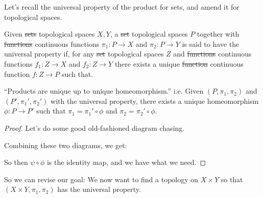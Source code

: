 \documentclass[12pt, twosided]{article}
\begin{document}
  Let's recall the universal property of the product for sets, and amend it for topological spaces.
  \begin{thm}
    Given \sout{sets} {\color{red} topological spaces} \(X, Y\), a \sout{set} {\color{red} topological spaces} \(P\) together with \sout{functions} {\color{red} continuous functions} \(\pi_1: P \to X\) and \(\pi_2: P \to Y\) is said to have the universal property if, for any \sout{set} {\color{red} topological spaces} \(Z\) and \sout{functions} {\color{red} continuous functions} \(f_1: Z \to X\) and \(f_2: Z \to Y\) there exists a unique \sout{function} {\color{red} continuous function} \(f: Z \to P\) such that.

    \begin{center}
    \end{center}
  \end{thm}
  \begin{prop}
    ``Products are unique up to unique homeomorphism.''
    i.e. Given \((P, \pi_1, \pi_2)\) and \((P\prime, \pi_1\prime, \pi_2\prime)\) with the universal property, there exists a unique homeomorphism \(\phi: P \to P\prime\) such that \(\pi_1 = \pi_1\prime \circ \phi\) and \(\pi_2 = \pi_2\prime \circ \phi\). 
  \end{prop}
  \begin{proof} Let's do some good old-fashioned diagram chasing.
    \begin{center}
    \end{center}
    Combining these two diagrams, we get:
    \begin{center}
    \end{center}
    So then \(\psi \circ \phi\) is the identity map, and we have what we need.
  \end{proof}
    So we can revise our goal: We now want to find a topology on \(X \times Y\) so that \((X \times Y, \pi_1, \pi_2)\) has the universal property.
\end{document}

